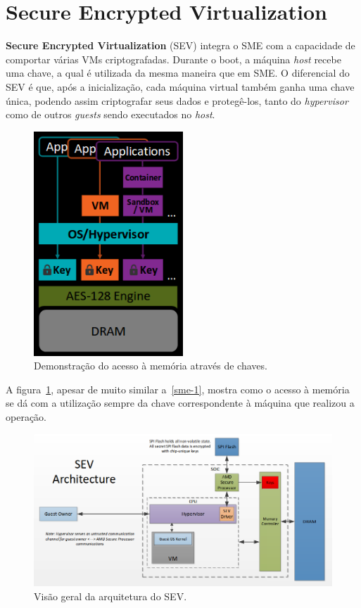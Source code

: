 \documentclass{report}
\begin{document}
\section{Secure Encrypted Virtualization}

\textbf{Secure Encrypted Virtualization} (SEV) integra o SME com a capacidade
de comportar várias VMs criptografadas. Durante o boot, a máquina \textit{host}
recebe uma chave, a qual é utilizada da mesma maneira que em SME. O diferencial
do SEV é que, após a inicialização, cada máquina virtual também ganha uma chave
única, podendo assim criptografar seus dados e protegê-los, tanto do
\textit{hypervisor} como de outros \textit{guests} sendo executados no
\textit{host}.

\begin{figure}[h]
    \centering
    \includegraphics[width=0.5\textwidth]{img/sev}
    \caption{Demonstração do acesso à memória através de chaves.}\label{sev}
\end{figure}

A figura~\ref{sev}, apesar de muito similar a~\ref{sme-1}, mostra como o acesso
à memória se dá com a utilização sempre da chave correspondente à máquina que
realizou a operação.


\begin{figure}[h]
    \centering
    \includegraphics[width=1\textwidth]{img/sev-architecture}
    \caption{Visão geral da arquitetura do SEV\@.}\label{sev-architecture}
\end{figure}
\end{document}
